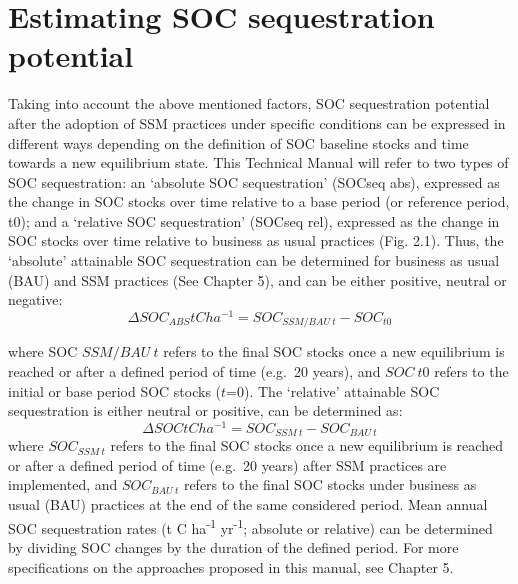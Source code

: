 \documentclass[
  10pt,
  b5paper,
]{book}
\begin{document}
\hypertarget{estimating-soc-sequestration-potential}{%
\section{Estimating SOC sequestration potential}\label{estimating-soc-sequestration-potential}}

Taking into account the above mentioned factors, SOC sequestration potential after the adoption of SSM practices under specific conditions can be expressed in different ways depending on the definition of SOC baseline stocks and time towards a new equilibrium state. This Technical Manual will refer to two types of SOC sequestration: an `absolute SOC sequestration' (SOCseq abs), expressed as the change in SOC stocks over time relative to a base period (or reference period, t0); and a `relative SOC sequestration' (SOCseq rel), expressed as the change in SOC stocks over time relative to business as usual practices (Fig. 2.1). Thus, the `absolute' attainable SOC sequestration can be determined for business as usual (BAU) and SSM practices (See Chapter 5), and can be either positive, neutral or negative:\\
\begin{equation}
\tag{2.1}
\Delta SOC_{ABS} t C ha^{-1} = SOC_{SSM/BAU \ t}  -  SOC_{t0}
\end{equation}

where SOC \(SSM/BAU\ t\) refers to the final SOC stocks once a new equilibrium is reached or after a defined period of time (e.g.~20 years), and \(SOC\  t0\) refers to the initial or base period SOC stocks (\(t\)=0). The `relative' attainable SOC sequestration is either neutral or positive, can be determined as:\\
\begin{equation}
\tag{2.2}
\Delta SOC t C ha^{-1} = SOC_{SSM \ t} -  SOC_{BAU \ t }
\end{equation}
where \(SOC_{SSM \ t}\) refers to the final SOC stocks once a new equilibrium is reached or after a defined period of time (e.g.~20 years) after SSM practices are implemented, and \(SOC_{BAU \ t}\) refers to the final SOC stocks under business as usual (BAU) practices at the end of the same considered period. Mean annual SOC sequestration rates (t C ha\textsuperscript{-1} yr\textsuperscript{-1}; absolute or relative) can be determined by dividing SOC changes by the duration of the defined period. For more specifications on the approaches proposed in this manual, see Chapter 5.
\end{document}
